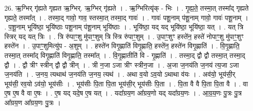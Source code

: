 \documentclass[17pt]{extarticle}
\begin{document}
26. ऋ॒ग्भिर् गृ॑ह्यते गृह्यत ऋ॒ग्भिर्. ऋ॒ग्भिर् गृ॑ह्यते । . ऋ॒ग्भिरित्यृ॑क् - भिः । . गृ॒ह्य॒ते॒ तस्मा॒त् तस्मा᳚द् गृह्यते गृह्यते॒ तस्मा᳚त् । . तस्मा॒द् गावो॒ गाव॒ स्तस्मा॒त् तस्मा॒द् गावः॑ । . गावः॑ पशू॒नाम् प॑शू॒नाम् गावो॒ गावः॑ पशू॒नाम् । . प॒शू॒नाम् भूयि॑ष्ठा॒ भूयि॑ष्ठाः पशू॒नाम् प॑शू॒नाम् भूयि॑ष्ठाः । . भूयि॑ष्ठा॒ यद् यद् भूयि॑ष्ठा॒ भूयि॑ष्ठा॒ यत् । . यत् त्रि स्त्रिर् यद् यत् त्रिः । . त्रि रु॑पाꣳ॒॒शु मु॑पाꣳ॒॒शुम् त्रि स्त्रि रु॑पाꣳ॒॒शुम् । . उ॒पाꣳ॒॒शुꣳ हस्ते॑न॒ हस्ते॑ नोपाꣳ॒॒शु मु॑पाꣳ॒॒शुꣳ हस्ते॑न । . उ॒पाꣳ॒॒शुमित्यु॑प - अ॒शुम् । . हस्ते॑न विगृ॒ह्णाति॑ विगृ॒ह्णाति॒ हस्ते॑न॒ हस्ते॑न विगृ॒ह्णाति॑ । . वि॒गृ॒ह्णाति॒ तस्मा॒त् तस्मा᳚द् विगृ॒ह्णाति॑ विगृ॒ह्णाति॒ तस्मा᳚त् । . वि॒गृ॒ह्णातीति॑ वि - गृ॒ह्णाति॑ । . तस्मा॒द् द्वौ द्वौ तस्मा॒त् तस्मा॒द् द्वौ । . द्वौ त्रीꣳ स्त्रीन् द्वौ द्वौ त्रीन् । . त्री न॒जा ऽजा त्रीꣳ स्त्रीन॒जा । . अ॒जा ज॒नय॑ति ज॒नय॑ त्य॒जा ऽजा ज॒नय॑ति । . ज॒नय॒ त्यथाथ॑ ज॒नय॑ति ज॒नय॒ त्यथ॑ । . अथा व॒यो ऽव॒यो ऽथाथा व॑यः । . अव॑यो॒ भूय॑सी॒र् भूय॑सी॒ रव॒यो ऽव॑यो॒ भूय॑सीः । . भूय॑सीः पि॒ता पि॒ता भूय॑सी॒र् भूय॑सीः पि॒ता । . पि॒ता वै वै पि॒ता पि॒ता वै । . वा ए॒ष ए॒ष वै वा ए॒षः । . ए॒ष यद् यदे॒ष ए॒ष यत् । . यदा᳚ग्रय॒ण आ᳚ग्रय॒णो यद् यदा᳚ग्रय॒णः । . आ॒ग्र॒य॒णः पु॒त्रः पु॒त्र आ᳚ग्रय॒ण आ᳚ग्रय॒णः पु॒त्रः । \newline
\end{document}
